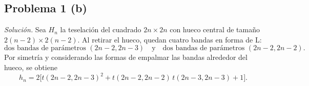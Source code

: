 \subsection*{Problema 1 (b)}
\emph{Solución.}
Sea \(H_n\) la teselación del cuadrado \(2n\times2n\) con hueco central de tamaño \(2(n-2)\times2(n-2)\). Al retirar el hueco, quedan cuatro bandas en forma de L:
\[
\text{dos bandas de parámetros }(2n-2,2n-3)\quad\text{y}\quad
\text{dos bandas de parámetros }(2n-2,2n-2).
\]
Por simetría y considerando las formas de empalmar las bandas alrededor del hueco, se obtiene
\[
h_n = 2\bigl[t(2n-2,2n-3)^2 + t(2n-2,2n-2)\,t(2n-3,2n-3) + 1\bigr].
\]
